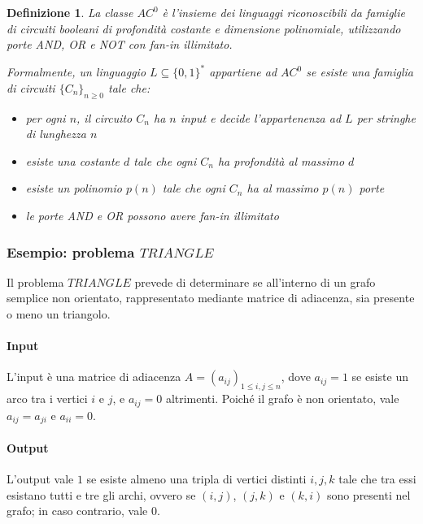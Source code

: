\documentclass[a4paper,12pt]{report}
\newtheorem{definition}{Definizione}[chapter]
\theoremstyle{propositionstyle}
\begin{document}
    \begin{definition}
        La classe $AC^0$ è l'insieme dei linguaggi riconoscibili da famiglie di circuiti booleani di profondità costante e dimensione polinomiale, utilizzando porte AND, OR e NOT con fan-in illimitato.

        Formalmente, un linguaggio $L \subseteq \{0,1\}^*$ appartiene ad $AC^0$ se esiste una famiglia di circuiti $\{C_n\}_{n \geq 0}$ tale che:
        \begin{itemize}
            \item per ogni $n$, il circuito $C_n$ ha $n$ input e decide l'appartenenza ad $L$ per stringhe di lunghezza $n$
            \item esiste una costante $d$ tale che ogni $C_n$ ha profondità al massimo $d$
            \item esiste un polinomio $p(n)$ tale che ogni $C_n$ ha al massimo $p(n)$ porte
            \item le porte AND e OR possono avere fan-in illimitato
        \end{itemize}
    \end{definition}

    \subsubsection{Esempio: problema $TRIANGLE$}
    Il problema $TRIANGLE$ prevede di determinare se all'interno di un grafo semplice non orientato, rappresentato mediante matrice di adiacenza,
    sia presente o meno un triangolo.

    \paragraph{Input}
    L'input è una matrice di adiacenza $A = (a_{ij})_{1 \leq i,j \leq n}$, dove $a_{ij} = 1$ se esiste un arco tra i vertici $i$ e $j$, e $a_{ij} = 0$ altrimenti.
    Poiché il grafo è non orientato, vale $a_{ij} = a_{ji}$ e $a_{ii} = 0$.

    \paragraph{Output}
    L'output vale $1$ se esiste almeno una tripla di vertici distinti $i,j,k$ tale che tra essi esistano tutti e tre gli archi,
    ovvero se $(i,j)$, $(j,k)$ e $(k,i)$ sono presenti nel grafo; in caso contrario, vale $0$.
\end{document}
